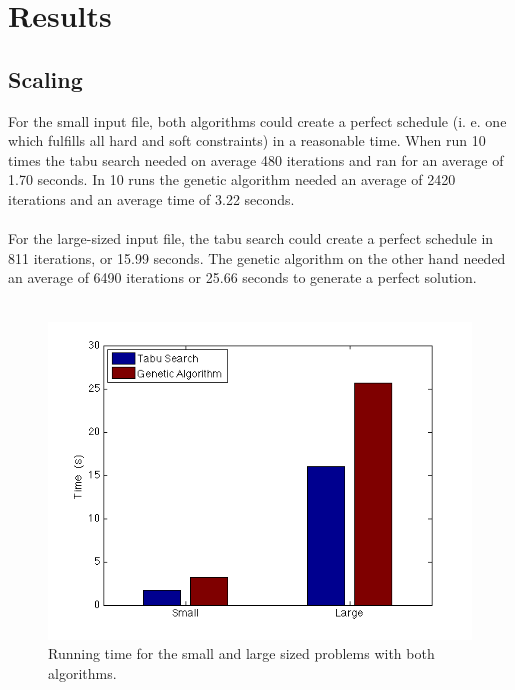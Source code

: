 \documentclass[titlepage,a4paper]{article}
\begin{document}
\section{Results}
\subsection{Scaling}
For the small input file, both algorithms could create a perfect schedule (i. e. one which fulfills all hard and soft constraints) in a reasonable time. When run 10 times the tabu search needed on average 480 iterations and ran for an average of 1.70 seconds. In 10 runs the genetic algorithm needed an average of 2420 iterations and an average time of 3.22 seconds. \\\\
For the large-sized input file, the tabu search could create a perfect schedule in 811 iterations, or 15.99 seconds. The genetic algorithm on the other hand needed an average of 6490 iterations or 25.66 seconds to generate a perfect solution.\\\\

\begin{figure}[H]
  \centering
    \includegraphics[scale=0.5]{../results/figures/time_bar_graph.png}
  \caption{Running time for the small and large sized problems with both algorithms.}
  \label{time_bar_graph}
\end{figure}

\pagebreak
\end{document}
